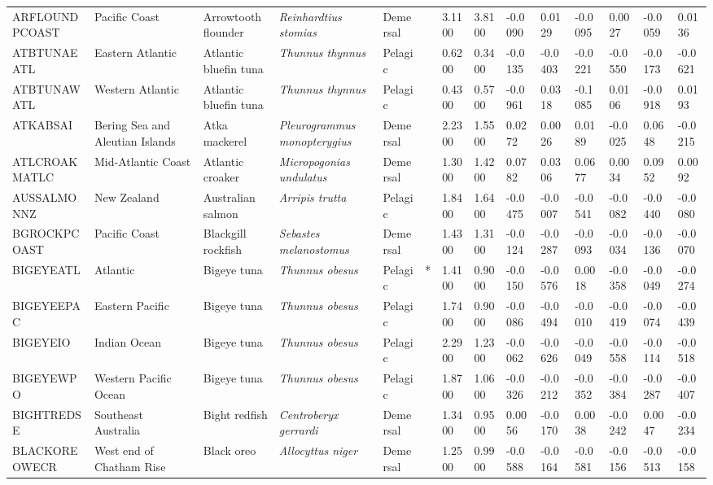 \begin{longtable}{p{2.6cm}p{1.9cm}p{1.7cm}p{1.6cm}p{1cm}p{0.3cm}p{1cm}p{1cm}p{1cm}p{1.1cm}p{1cm}p{1.1cm}p{1cm}p{1.1cm}}
  ARFLOUNDPCOAST & Pacific Coast & Arrowtooth flounder & \textit{Reinhardtius stomias} & Demersal &   & 3.1100 & 3.8100 & -0.0090 & 0.0129 & -0.0095 & 0.0027 & -0.0059 & 0.0136 \\ 
  ATBTUNAEATL & Eastern Atlantic & Atlantic bluefin tuna & \textit{Thunnus thynnus} & Pelagic &   & 0.6200 & 0.3400 & -0.0135 & -0.0403 & -0.0221 & -0.0550 & -0.0173 & -0.0621 \\ 
  ATBTUNAWATL & Western Atlantic & Atlantic bluefin tuna & \textit{Thunnus thynnus} & Pelagic &   & 0.4300 & 0.5700 & -0.0961 & 0.0318 & -0.1085 & 0.0106 & -0.0918 & 0.0193 \\ 
  ATKABSAI & Bering Sea and Aleutian Islands & Atka mackerel & \textit{Pleurogrammus monopterygius} & Demersal &   & 2.2300 & 1.5500 & 0.0272 & 0.0026 & 0.0189 & -0.0025 & 0.0648 & -0.0215 \\ 
  ATLCROAKMATLC & Mid-Atlantic Coast & Atlantic croaker & \textit{Micropogonias undulatus} & Demersal &   & 1.3000 & 1.4200 & 0.0782 & 0.0306 & 0.0677 & 0.0034 & 0.0952 & 0.0092 \\ 
  AUSSALMONNZ & New Zealand & Australian salmon & \textit{Arripis trutta} & Pelagic &   & 1.8400 & 1.6400 & -0.0475 & -0.0007 & -0.0541 & -0.0082 & -0.0440 & -0.0080 \\ 
  BGROCKPCOAST & Pacific Coast & Blackgill rockfish & \textit{Sebastes melanostomus} & Demersal &   & 1.4300 & 1.3100 & -0.0124 & -0.0287 & -0.0093 & -0.0034 & -0.0136 & -0.0070 \\ 
  BIGEYEATL & Atlantic & Bigeye tuna & \textit{Thunnus obesus} & Pelagic & * & 1.4100 & 0.9000 & -0.0150 & -0.0576 & 0.0018 & -0.0358 & -0.0049 & -0.0274 \\ 
  BIGEYEEPAC & Eastern Pacific & Bigeye tuna & \textit{Thunnus obesus} & Pelagic &   & 1.7400 & 0.9000 & -0.0086 & -0.0494 & -0.0010 & -0.0419 & -0.0074 & -0.0439 \\ 
  BIGEYEIO & Indian Ocean & Bigeye tuna & \textit{Thunnus obesus} & Pelagic &   & 2.2900 & 1.2300 & -0.0062 & -0.0626 & -0.0049 & -0.0558 & -0.0114 & -0.0518 \\ 
  BIGEYEWPO & Western Pacific Ocean & Bigeye tuna & \textit{Thunnus obesus} & Pelagic &   & 1.8700 & 1.0600 & -0.0326 & -0.0212 & -0.0352 & -0.0384 & -0.0287 & -0.0407 \\ 
  BIGHTREDSE & Southeast Australia & Bight redfish & \textit{Centroberyx gerrardi} & Demersal &   & 1.3400 & 0.9500 & 0.0056 & -0.0170 & 0.0038 & -0.0242 & 0.0047 & -0.0234 \\ 
  BLACKOREOWECR & West end of Chatham Rise & Black oreo & \textit{Allocyttus niger} & Demersal &   & 1.2500 & 0.9900 & -0.0588 & -0.0164 & -0.0581 & -0.0156 & -0.0513 & -0.0158 \\ 

\end{longtable}
